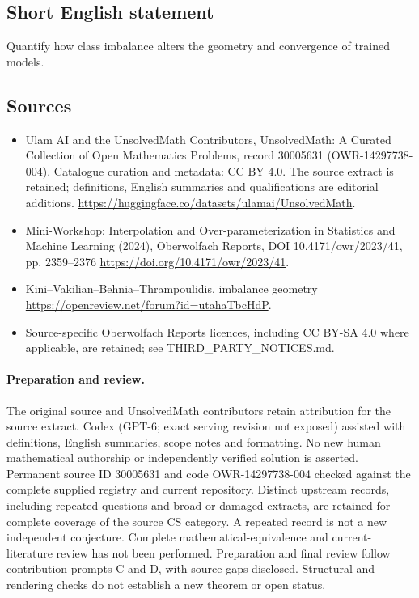 \documentclass[11pt]{article}
\begin{document}
\subsection{Short English statement}
Quantify how class imbalance alters the geometry and convergence of trained models.
\subsection{Sources}
\begin{itemize}
\item[\hypertarget{source:30005631:1}{S1}] Ulam AI and the UnsolvedMath Contributors, UnsolvedMath: A Curated Collection of Open Mathematics Problems, record 30005631 (OWR-14297738-004). Catalogue curation and metadata: CC BY 4.0. The source extract is retained; definitions, English summaries and qualifications are editorial additions.
\url{https://huggingface.co/datasets/ulamai/UnsolvedMath}.
\item[\hypertarget{source:30005631:2}{S2}] Mini-Workshop: Interpolation and Over-parameterization in Statistics and Machine Learning​ (2024), Oberwolfach Reports, DOI 10.4171/owr/2023/41, pp. 2359--2376
\url{https://doi.org/10.4171/owr/2023/41}.
\item[\hypertarget{source:30005631:3}{S3}] Kini--Vakilian--Behnia--Thrampoulidis, imbalance geometry
\url{https://openreview.net/forum?id=utahaTbcHdP}.
\item Source-specific Oberwolfach Reports licences, including CC BY-SA 4.0 where applicable, are retained; see THIRD\_PARTY\_NOTICES.md.
\end{itemize}
\paragraph{Preparation and review.}
The original source and UnsolvedMath contributors retain attribution for the source extract. Codex (GPT-6; exact serving revision not exposed) assisted with definitions, English summaries, scope notes and formatting. No new human mathematical authorship or independently verified solution is asserted. Permanent source ID 30005631 and code OWR-14297738-004 checked against the complete supplied registry and current repository. Distinct upstream records, including repeated questions and broad or damaged extracts, are retained for complete coverage of the source CS category. A repeated record is not a new independent conjecture. Complete mathematical-equivalence and current-literature review has not been performed. Preparation and final review follow contribution prompts C and D, with source gaps disclosed. Structural and rendering checks do not establish a new theorem or open status.
\label{end:30005631}
\end{document}
